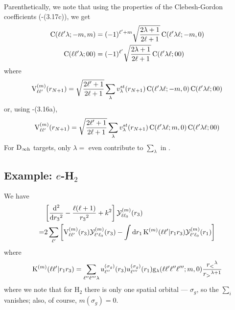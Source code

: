\documentclass[aps,pra,groupedaddress,12pt,
               amsfonts,amssymb,
               preprint
    ]{revtex4}
\begin{document}
Parenthetically, we note that using the properties of the Clebesh-Gordon
coefficients (\cite{MER1957}-(3.17c)), we get
\begin{subequations}
  \begin{align}
    \mathrm{C}(\ell\ell'\lambda;-m,m) & =
      (-1)^{\ell'+m}\sqrt{\dfrac{2\lambda+1}{2\ell+1}}\,\mathrm{C}(\ell'\lambda\ell;-m,0) \\
    \mathrm{C}(\ell\ell'\lambda;00) & =
      (-1)^{\ell'}\sqrt{\dfrac{2\lambda+1}{2\ell+1}}\,\mathrm{C}(\ell'\lambda\ell;00)
  \end{align}
\end{subequations}
where
\begin{equation}
  \label{eq:mvstb}
  \mathrm{V}_{\ell\ell'}^{(m)}(r_{N+1}) = \sqrt{\dfrac{2\ell'+1}{2\ell+1}}
                        \sum_{\lambda}v_\lambda^{st}(r_{N+1})
                        \,\mathrm{C}(\ell'\lambda\ell;-m,0)\,\mathrm{C}(\ell'\lambda\ell;00)
\end{equation}
or, using \cite{MER1957}-(3.16a),
\begin{equation}
  \label{eq:mvstc}
  \mathrm{V}_{\ell\ell'}^{(m)}(r_{N+1}) = \sqrt{\dfrac{2\ell'+1}{2\ell+1}}
                        \sum_{\lambda}v_\lambda^{st}(r_{N+1})
                        \,\mathrm{C}(\ell'\lambda\ell;m,0)\,\mathrm{C}(\ell'\lambda\ell;00)
\end{equation}
For $\mathrm{D}_{\infty\text{h}}$ targets, only $\lambda = $ even contribute to $\sum_\lambda$
in .

\subsection{Example: $e$-H$_2$}
\label{sec:example:-e-h_2}
We have
\begin{equation}
  \label{eq:CEESh}
  \begin{split}
    &\left[\dfrac{\mathrm{d}^2}{\mathrm{d} r_{3}{}^2}
      -\dfrac{\ell(\ell+1)}{r_{3}{}^2}+k^2\right]\mathcal{Y}_{\ell\ell_0}^{(m)}(r_{3}) \\
    = & 2\sum_{\ell'}\left[\mathrm{V}_{\ell\ell'}^{(m)}(r_{3})\mathcal{Y}_{\ell'\ell_0}^{(m)}(r_{3}) - \int\mathrm{d}
      r_1\,\mathrm{K}^{(m)}(\ell\ell'|r_1r_{3})\mathcal{Y}_{\ell'\ell_0}^{(m)}(r_{1})\right]
  \end{split}
\end{equation}
where
\begin{equation}
  \label{eq:KEXh}
  \mathrm{K}^{(m)}(\ell\ell'|r_1r_{3}) = \sum_{\ell''\ell'''\lambda}
  u_{\ell''}^{(\sigma_g)}(r_{3})u_{\ell'''}^{(\sigma_g)}(r_1)\mathrm{g}_{\lambda}(\ell\ell'\ell''\ell''';m,0)\dfrac{r_<{}^\lambda}{r_>{}^{\lambda+1}}
\end{equation}
where we note that for H$_2$ there is only one spatial orbital ---
$\sigma_g$, so the $\sum_i$ vanishes; also, of course, $m(\sigma_g) =
0$.
\end{document}
